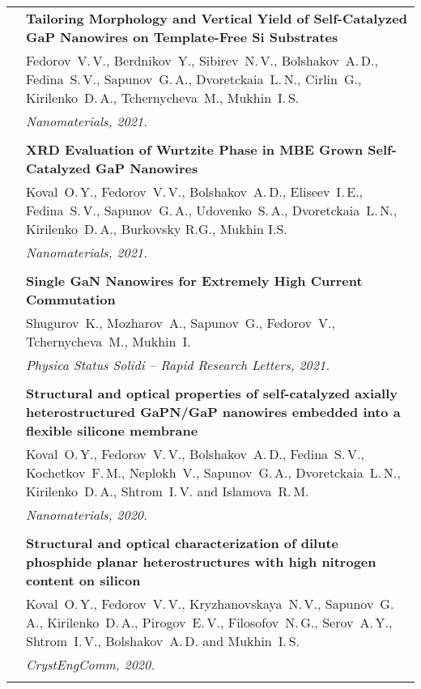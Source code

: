 \documentclass[letterpaper, 11pt]{article}
\begin{document}
\begin{longtable}{p{1.3in}p{4.8in}}
        & \textbf{Tailoring Morphology and Vertical Yield of Self-Catalyzed GaP
        Nanowires on Template-Free Si Substrates} \\
        & Fedorov~V.\,V., Berdnikov~Y., Sibirev~N.\,V., Bolshakov~A.\,D.,
        Fedina~S.\,V., Sapunov~G.\,A., Dvoretckaia~L.\,N., Cirlin~G.,
        Kirilenko~D.\,A., Tchernycheva~M., Mukhin~I.\,S. \\
		& \textit{Nanomaterials, 2021.}\\
		& \\

        & \textbf{XRD Evaluation of Wurtzite Phase in MBE Grown Self-Catalyzed
        GaP Nanowires} \\
        & Koval~O.\,Y., Fedorov~V.\,V., Bolshakov~A.\,D., Eliseev~I.\,E.,
        Fedina~S.\,V., Sapunov~G.\,A., Udovenko~S.\,A., Dvoretckaia~L.\,N.,
        Kirilenko~D.\,A., Burkovsky R.G., Mukhin I.S. \\
		& \textit{Nanomaterials, 2021.}\\
		& \\

        & \textbf{Single GaN Nanowires for Extremely High Current Commutation}
        \\
        & Shugurov~K., Mozharov~A., Sapunov~G., Fedorov~V., Tchernycheva~M.,
        Mukhin~I. \\
		& \textit{Physica Status Solidi -- Rapid Research Letters, 2021.}\\
		& \\

        & \textbf{Structural and optical properties of self-catalyzed axially
        heterostructured GaPN/GaP nanowires embedded into a flexible silicone
        membrane} \\
        & Koval~O.\,Y., Fedorov~V.\,V., Bolshakov~A.\,D., Fedina~S.\,V.,
        Kochetkov~F.\,M., Neplokh~V., Sapunov~G.\,A., Dvoretckaia~L.\,N.,
        Kirilenko~D.\,A., Shtrom~I.\,V. and Islamova~R.\,M. \\
		& \textit{Nanomaterials, 2020.}\\
		& \\
		
        & \textbf{Structural and optical characterization of dilute phosphide
        planar heterostructures with high nitrogen content on silicon} \\
        & Koval~O.\,Y., Fedorov~V.\,V., Kryzhanovskaya~N.\,V., Sapunov~G.\,A.,
        Kirilenko~D.\,A., Pirogov~E.\,V., Filosofov~N.\,G., Serov~A.\,Y.,
        Shtrom~I.\,V., Bolshakov~A.\,D. and Mukhin~I.\,S. \\
		& \textit{CrystEngComm, 2020.}\\
		& \\
		

\end{longtable}
\end{document}
